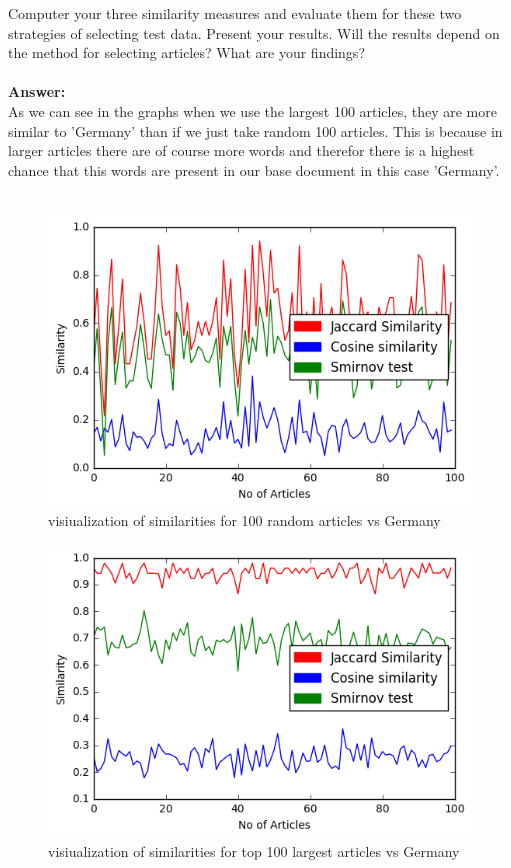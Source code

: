 \documentclass{WeSTassignment}
\begin{document}
Computer your three similarity measures and evaluate them for these two strategies of selecting test data. Present your results. Will the results depend on the method for selecting articles? What are your findings? \\\\
\textbf{Answer:}\\
As we can see in the graphs when we use the largest 100 articles, they are more similar to 'Germany' than if we just take random 100 articles.
This is because in larger articles there are of course more words and therefor there is a highest chance that this words are present in our base document in this case 'Germany'. \\\\
\begin{figure}[h]
  \centering
  \includegraphics[scale=0.5]{comparerandom.png}
   \caption{visiualization of similarities for 100 random articles vs Germany}
     \label{fig:dig} 
\end{figure}

\begin{figure}[h]
  \centering
  \includegraphics[scale=0.5]{comparetop100.png}
   \caption{visiualization of similarities for top 100 largest articles vs Germany}
     \label{fig:dig} 
\end{figure}
\end{document}
